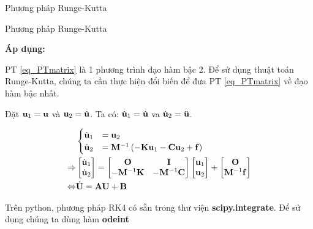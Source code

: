 \documentclass[aspectratio=169, t]{beamer} %
\begin{document}
\begin{frame}{Phương pháp Runge-Kutta}
\end{frame}

\begin{frame}{Phương pháp Runge-Kutta}

\textbf{Áp dụng:}

PT \ref{eq_PTmatrix} là 1 phương trình đạo hàm bậc 2. Để sử dụng thuật toán Runge-Kutta, chúng ta cần thực hiện đổi biến để đưa PT \ref{eq_PTmatrix} về đạo hàm bậc nhất.

Đặt ${\bf u}_1 = {\bf u}$ và ${\bf u}_2 = \dot{\bf u}$. Ta có: $\dot{\bf u}_1 = \dot{\bf u}$ va $\dot{\bf u}_2 = \ddot{\bf u}$.

\begin{equation}
    \begin{aligned}
    &\begin{cases}
        \dot{\bf u}_1 &= {\bf u}_2 \\
        \dot{\bf u}_2 &= {\bf M}^{-1}\left(-{\bf K}{\bf u}_1-{\bf C}{\bf u}_2 + {\bf f}\right)
    \end{cases} \\
    \Rightarrow &\begin{bmatrix}
        \dot{\bf u}_1 \\ \dot{\bf u}_2
    \end{bmatrix} = \begin{bmatrix}
        {\bf O} & {\bf I} \\
        -{\bf M}^{-1}{\bf K} & -{\bf M}^{-1}{\bf C}
    \end{bmatrix}\begin{bmatrix}
        {\bf u}_1 \\ {\bf u}_2
    \end{bmatrix} + \begin{bmatrix}
        {\bf O} \\ {\bf M}^{-1}{\bf f}
    \end{bmatrix} \\
    \Leftrightarrow & \dot{\bf U} = {\bf A} {\bf U} + {\bf B}
    \end{aligned}
\end{equation}

Trên python, phương pháp RK4 có sẵn trong thư viện \textbf{scipy.integrate}. Để sử dụng chúng ta dùng hàm \textbf{odeint}
    
\end{frame}
\end{document}

